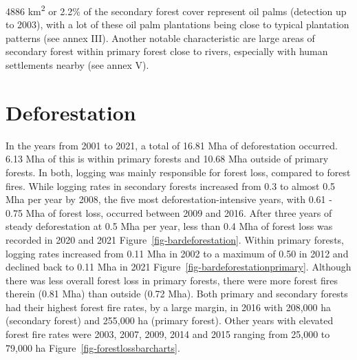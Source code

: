 \documentclass[
  letterpaper,
  DIV=11,
  numbers=noendperiod]{scrreprt}
\begin{document}
4886 km\textsuperscript{2} or 2.2\% of the secondary forest cover
represent oil palms (detection up to 2003), with a lot of these oil palm
plantations being close to typical plantation patterns (see annex III).
Another notable characteristic are large areas of secondary forest
within primary forest close to rivers, especially with human settlements
nearby (see annex V).

\hypertarget{deforestation-1}{%
\section{Deforestation}\label{deforestation-1}}

In the years from 2001 to 2021, a total of 16.81 Mha of deforestation
occurred. 6.13 Mha of this is within primary forests and 10.68 Mha
outside of primary forests. In both, logging was mainly responsible for
forest loss, compared to forest fires. While logging rates in secondary
forests increased from 0.3 to almost 0.5 Mha per year by 2008, the five
most deforestation-intensive years, with 0.61 - 0.75 Mha of forest loss,
occurred between 2009 and 2016. After three years of steady
deforestation at 0.5 Mha per year, less than 0.4 Mha of forest loss was
recorded in 2020 and 2021 Figure~\ref{fig-bardeforestation}. Within
primary forests, logging rates increased from 0.11 Mha in 2002 to a
maximum of 0.50 in 2012 and declined back to 0.11 Mha in 2021
Figure~\ref{fig-bardeforestationprimary}. Although there was less
overall forest loss in primary forests, there were more forest fires
therein (0.81 Mha) than outside (0.72 Mha). Both primary and secondary
forests had their highest forest fire rates, by a large margin, in 2016
with 208,000 ha (secondary forest) and 255,000 ha (primary forest).
Other years with elevated forest fire rates were 2003, 2007, 2009, 2014
and 2015 ranging from 25,000 to 79,000 ha
Figure~\ref{fig-forestlossbarcharts}.
\end{document}
